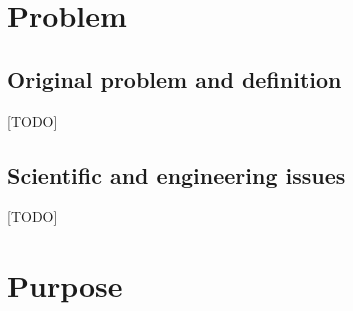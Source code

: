 \section{Problem}


\subsection{Original problem and definition}
[TODO]

\subsection{Scientific and engineering issues}
[TODO]

\section{Purpose}



